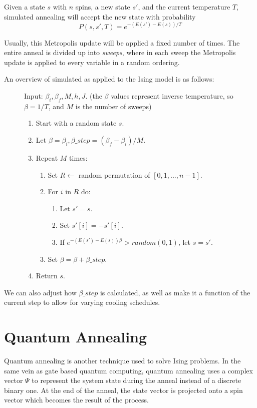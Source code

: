 \documentclass[11pt]{report}
\newcommand{\?}{\stackrel{?}{=}}
\begin{document}
Given a state $s$ with $n$ spins, a new state $s'$, and the current temperature $T$, simulated annealing will accept the new state with probability
$$P(s, s', T) = e^{-(E(s')-E(s))/T}$$

Usually, this Metropolis update will be applied a fixed number of times. The entire anneal is divided up into \textit{sweeps}, where in each sweep the Metropolis update is applied to every variable in a random ordering.

An overview of simulated as applied to the Ising model is as follows:

\begin{figure}[H]
Input: $\beta_i, \beta_f, M, h, J$. (the $\beta$ values represent inverse temperature, so $\beta = 1/T$, and $M$ is the number of sweeps)
\begin{enumerate}
\item Start with a random state $s$.
\item Let $\beta = \beta_i, \beta\_step = (\beta_f - \beta_i)/M$.
\item Repeat $M$ times:
	\begin{enumerate}
	\item Set $R \gets$ random permutation of $[0,1,...,n-1]$.
	\item For $i$ in $R$ do:
		\begin{enumerate}
		\item Let $s' = s$.
		\item Set $s'[i] = -s'[i]$.
		\item If $e^{-(E(s')-E(s))\beta} > random(0,1)$, let $s = s'$.
		\end{enumerate}
		\item Set $\beta = \beta + \beta\_step$.
	\end{enumerate}
\item Return $s$.
\end{enumerate}
\end{figure}

We can also adjust how $\beta\_step$ is calculated, as well as make it a function of the current step to allow for varying cooling schedules.

\section{Quantum Annealing}

Quantum annealing is another technique used to solve Ising problems. In the same vein as gate based quantum computing, quantum annealing uses a complex vector $\Psi$ to represent the system state during the anneal instead of a discrete binary one. At the end of the anneal, the state vector is projected onto a spin vector which becomes the result of the process.
\end{document}
